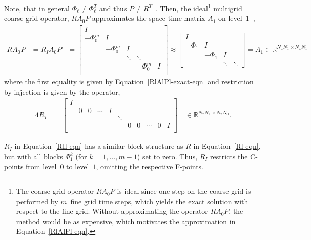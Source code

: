 \documentclass[3p]{elsarticle}
\begin{document}
Note, that in general $\Phi_\ell \neq \Phi_\ell^T$
and thus $P \neq R^T$~\cite[Equation (28)]{HessenthalerNordslettenRoehrleSchroderFalgout2018}.
Then, the ideal\footnote{The coarse-grid operator $R A_0 P$ is ideal
since one step on the coarse grid is performed by $m$~fine grid time steps,
which yields the exact solution with respect to the fine grid.
Without approximating the operator $R A_0 P$, the method would be as expensive,
which motivates the approximation in Equation~\eqref{RlAlPl-eqn}.}
multigrid coarse-grid operator, $R A_0 P$ approximates the space-time matrix $A_1$
on level~$1$~\cite{DobrevKolevPeterssonSchroder2017},
\begin{align}
    R A_0 P
    &= R_I A_0 P
    &= \begin{bmatrix}
        I \\
        - \Phi_0^m & I \\
        & - \Phi_0^m & I \\
        && \ddots & \ddots \\
        &&& - \Phi_0^m & I \\
    \end{bmatrix}
    \approx \begin{bmatrix}
        I \\
        -\Phi_1 & I \\
                   & -\Phi_1 & I \\
                &               & \ddots & \ddots
    \end{bmatrix}
    = A_1 \in \mathbb{R}^{N_x N_1 \times N_x N_1}
    \label{RlAlPl-eqn}
\end{align}
where the first equality is given by Equation~\eqref{RlAlPl-exact-eqn}
and restriction by injection is given by the operator,
\begin{alignat}{4}
    R_I &= \begin{bmatrix}
        I \\
        & 0 & 0 & \cdots & I \\
        &   &   &        &   & \ddots \\
        &   &   &        &   &        & 0 & 0 & \cdots & 0 & I \\
    \end{bmatrix} \quad \in \mathbb{R}^{N_x N_1 \times N_x N_0}.
    \label{RIl-eqn}
\end{alignat}

$R_I$ in Equation~\eqref{RIl-eqn} has a similar block structure as $R$ in Equation~\ref{Rl-eqn},
but with all blocks $\Phi_1^k$ (for $k = 1, \ldots, m - 1$) set to zero.
Thus, $R_I$ restricts the C-points from level~$0$ to level~$1$, omitting the respective F-points.
\end{document}
